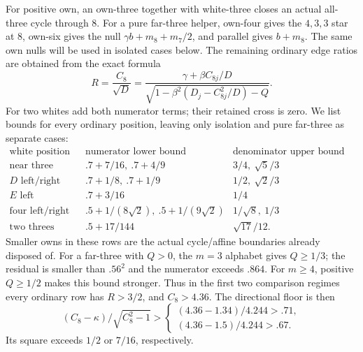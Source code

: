 \documentclass[11pt]{article}
\theoremstyle{definition}
\theoremstyle{remark}
\begin{document}
For positive own, an own-three together with white-three closes an
actual all-three cycle through \(8\). For a pure far-three helper,
own-four gives the \(4,3,3\) star at \(8\), own-six gives the null
\(\gamma b+m_8+m_7/2\), and parallel gives \(b+m_8\).
The same own nulls will be used in isolated cases below.
The remaining ordinary edge ratios are obtained from the exact formula
\[
 R=\frac{C_8}{\sqrt D}
 =\frac{\gamma+\beta C_{8j}/D}
 {\sqrt{1-\beta^2(D_j-C_{8j}^2/D)-Q}}.
\]
For two whites add both numerator terms; their retained cross is zero.
We list bounds for every ordinary position, leaving only isolation
and pure far-three as separate cases:
\[
\begin{array}{c|c|c}
\text{white position}&\text{numerator lower bound}&
 \text{denominator upper bound before foreign cost}\\ \hline
\text{near three left/right}&.7+7/16,\ .7+4/9&3/4,\ \sqrt5/3\\
D\text{ left/right}&.7+1/8,\ .7+1/9&1/2,\ \sqrt2/3\\
E\text{ left}&.7+3/16&1/4\\
\text{four left/right}&.5+1/(8\sqrt2),\
 .5+1/(9\sqrt2)&1/\sqrt8,\ 1/3\\
\text{two threes}&.5+17/144&\sqrt{17}/12 .
\end{array}
\]
Smaller owns in these rows are the actual cycle/affine boundaries
already disposed of. For a far-three with \(Q>0\), the
\(m=3\) alphabet gives \(Q\geq1/3\); the residual is smaller
than \(.56^2\) and the numerator exceeds \(.864\).
For \(m\geq4\), positive \(Q\geq1/2\) makes this bound stronger.
Thus in the first two comparison regimes every ordinary row has
\(R>3/2\), and \(C_8>4.36\).
The directional floor is then
\[
 (C_8-\kappa)/\sqrt{C_8^2-1}>
 \begin{cases}(4.36-1.34)/4.244>.71,\\
 (4.36-1.5)/4.244>.67 .
 \end{cases}
\]
Its square exceeds \(1/2\) or \(7/16\), respectively.
\end{document}
